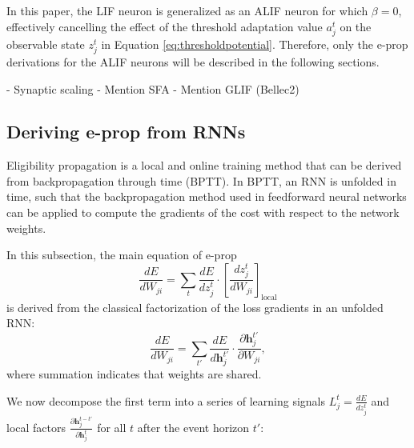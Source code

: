             In this paper, the LIF neuron is generalized as an ALIF neuron for which $\beta=0$, effectively cancelling the effect of the threshold adaptation value $a^t_j$ on the observable state $z^t_j$ in Equation \ref{eq:thresholdpotential}.
            Therefore, only the e-prop derivations for the ALIF neurons will be described in the following sections.

            \begin{tcolorbox}[colback=orange]
            - Synaptic scaling
            - Mention SFA
              - Mention GLIF (Bellec2)

            \end{tcolorbox}

    \subsection{Deriving e-prop from RNNs}\label{sec:derivefromBPTT}
        Eligibility propagation is a local and online training method that can be derived from backpropagation through time (BPTT).
        In BPTT, an RNN is unfolded in time, such that the backpropagation method used in feedforward neural networks can be applied to compute the gradients of the cost with respect to the network weights.

        In this subsection, the main equation of e-prop
        \begin{equation}
        \frac{dE}{dW_{ji}} =
        \sum_t\frac{dE}{dz_j^t}\cdot\left[\frac{dz_j^t}{dW_{ji}}\right]_\text{local}
        \end{equation}
        is derived from the classical factorization of the loss gradients in an unfolded RNN:
        \begin{equation}\label{eq:clafac}
        \frac{dE}{dW_{ji}} = \sum_{t'}\frac{dE}{d\mathbf{h}_j^{t'}}\cdot\frac{\partial \mathbf{h}_j^{t'}}{\partial W_{ji}},
        \end{equation}
        where summation indicates that weights are shared.

        We now decompose the first term into a series of learning signals $L_j^t = \frac{dE}{dz_j^t}$ and local factors $\frac{\partial\mathbf{h}_j^{t-t'}}{\partial\mathbf{h}_j^t}$ for all $t$ after the event horizon $t'$:

